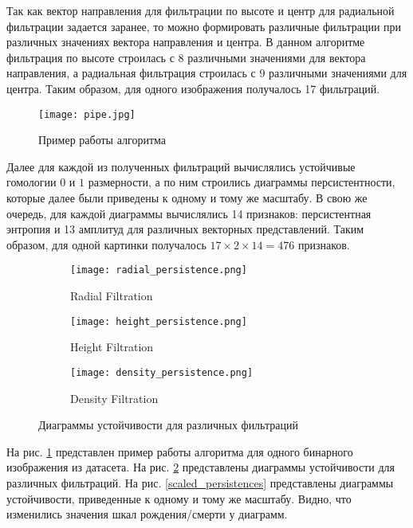 Так как вектор направления для фильтрации по высоте и центр для радиальной фильтрации задается заранее, то можно формировать различные фильтрации при различных значениях вектора направления и центра. В данном алгоритме фильтрация по высоте строилась с $8$ различными значениями для вектора направления, а радиальная фильтрация строилась с $9$ различными значениями для центра. Таким образом, для одного изображения получалось 17 фильтраций.

\begin{figure}[!htbp]
	\begin{center}
		\texttt{[image: pipe.jpg]}\\
		\caption{Пример работы алгоритма}
		\label{example}
	\end{center}
\end{figure}

Далее для каждой из полученных фильтраций вычислялись устойчивые гомологии $0$ и $1$ размерности, а по ним строились диаграммы персистентности, которые далее были приведены к одному и тому же масштабу. В свою же очередь, для каждой диаграммы вычислялись 14 признаков: персистентная энтропия и 13 амплитуд для различных векторных представлений. Таким образом, для одной картинки получалось $17 \times 2 \times 14 = 476$ признаков.

\begin{figure}[!htbp]
	\begin{subfigure}{.33\textwidth}
		\centering
		\texttt{[image: radial\_persistence.png]}\\
		\caption{Radial Filtration}
	\end{subfigure}%
	\begin{subfigure}{.33\textwidth}
		\centering
		\texttt{[image: height\_persistence.png]}\\
		\caption{Height Filtration}
	\end{subfigure}%
	\begin{subfigure}{.33\textwidth}
		\centering
		\texttt{[image: density\_persistence.png]}\\
		\caption{Density Filtration}
	\end{subfigure}%
	\caption{Диаграммы устойчивости для различных фильтраций}
	\label{persistences}
\end{figure}

 На рис. \ref{example} представлен пример работы алгоритма для одного бинарного изображения из датасета. На рис. \ref{persistences} представлены диаграммы устойчивости для различных фильтраций. На рис. \ref{scaled_persistences} представлены диаграммы устойчивости, приведенные к одному и тому же масштабу. Видно, что изменились значения шкал рождения/смерти у диаграмм.


